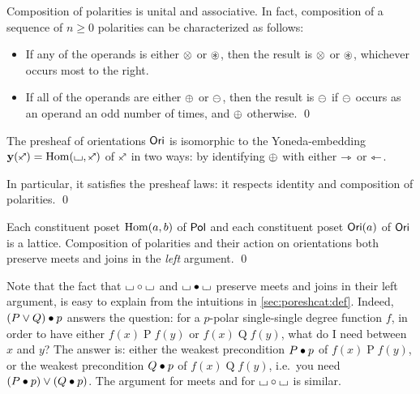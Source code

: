 \documentclass[a4paper]{memoir}
\begin{document}
\begin{proposition}
	Composition of polarities is unital and associative.
	In fact, composition of a sequence of $n \geq 0$ polarities can be characterized as follows:
	\begin{itemize}
		\item If any of the operands is either ${\otimes}$ or ${\oast}$, then the result is ${\otimes}$ or ${\oast}$, whichever occurs most to the right.
		\item If all of the operands are either ${\oplus}$ or ${\ominus}$, then the result is ${\ominus}$ if ${\ominus}$ occurs as an operand an odd number of times, and ${\oplus}$ otherwise. \qed
	\end{itemize}
\end{proposition}
\begin{proposition}
	The presheaf of orientations ${\mathsf{Ori}}$ is isomorphic to the Yoneda-embedding $\yoneda(\ypolar) = \Hom(\loch, \ypolar)$ of $\ypolar$ in two ways: by identifying ${\oplus}$ with either ${\rightarrowtriangle}$ or ${\leftarrowtriangle}$. 
	
	In particular, it satisfies the presheaf laws: it respects identity and composition of polarities. \qed
\end{proposition}
\begin{proposition}
	\label{thm:pol-lattice}
	\label{thm:ori-lattice}
	\label{thm:pol-pol-lattice}
	\label{thm:ori-pol-lattice}
	Each constituent poset ${\mathrm{Hom}}(a, b)$ of ${\mathsf{Pol}}$ and each constituent poset ${\mathsf{Ori}}(a)$ of ${\mathsf{Ori}}$ is a lattice.
	Composition of polarities and their action on orientations both preserve meets and joins in the \emph{left} argument. \qed
\end{proposition}
Note that the fact that ${\llcorner\hspace{-.4ex}\lrcorner} \circ {\llcorner\hspace{-.4ex}\lrcorner}$ and ${\llcorner\hspace{-.4ex}\lrcorner} \mathbin{\bullet} {\llcorner\hspace{-.4ex}\lrcorner}$ preserve meets and joins in their left argument, is easy to explain from the intuitions in \cref{sec:poreshcat:def}.
Indeed, $(P \vee Q) \mathbin{\bullet} p$ answers the question: for a $p$-polar single-single degree function $f$, in order to have either $f(x) \mathrel{P} f(y)$ or $f(x) \mathrel{Q} f(y)$, what do I need between $x$ and $y$?
The answer is: either the weakest precondition $P \mathbin{\bullet} p$ of $f(x) \mathrel{P} f(y)$, or the weakest precondition $Q \mathbin{\bullet} p$ of $f(x) \mathrel{Q} f(y)$, i.e.\ you need $(P \mathbin{\bullet} p) \vee (Q \mathbin{\bullet} p)$.
The argument for meets and for ${\llcorner\hspace{-.4ex}\lrcorner} \circ {\llcorner\hspace{-.4ex}\lrcorner}$ is similar.
\end{document}

